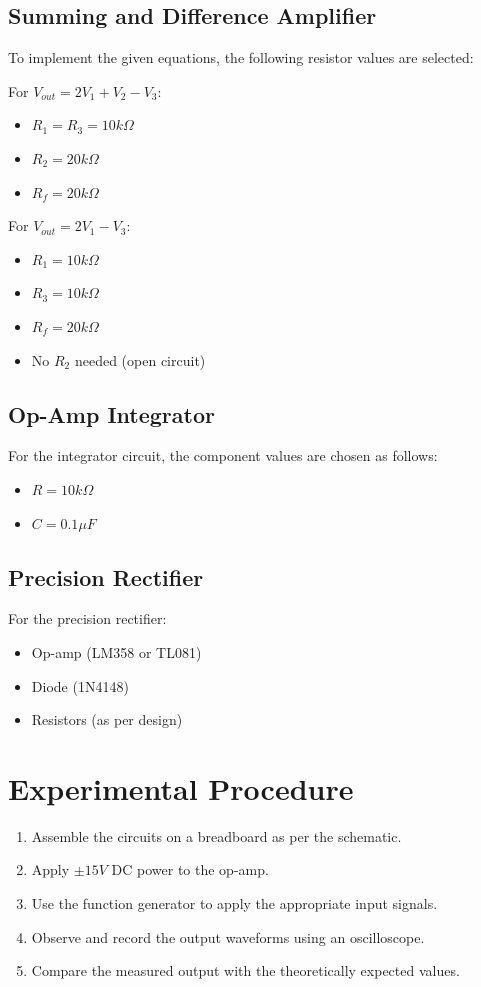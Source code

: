 \documentclass[a4paper,12pt]{article}
\begin{document}
\subsection{Summing and Difference Amplifier}
To implement the given equations, the following resistor values are selected:

For \( V_{out} = 2V_1 + V_2 - V_3 \):
\begin{itemize}
    \item \( R_1 = R_3 = 10k\Omega \)
    \item \( R_2 = 20k\Omega \)
    \item \( R_f = 20k\Omega \)
\end{itemize}

For \( V_{out} = 2V_1 - V_3 \):
\begin{itemize}
    \item \( R_1 = 10k\Omega \)
    \item \( R_3 = 10k\Omega \)
    \item \( R_f = 20k\Omega \)
    \item No \( R_2 \) needed (open circuit)
\end{itemize}

\subsection{Op-Amp Integrator}
For the integrator circuit, the component values are chosen as follows:
\begin{itemize}
    \item \( R = 10k\Omega \)
    \item \( C = 0.1\mu F \)
\end{itemize}

\subsection{Precision Rectifier}
For the precision rectifier:
\begin{itemize}
    \item Op-amp (LM358 or TL081)
    \item Diode (1N4148)
    \item Resistors (as per design)
\end{itemize}

\section{Experimental Procedure}
\begin{enumerate}
    \item Assemble the circuits on a breadboard as per the schematic.
    \item Apply \( \pm 15V \) DC power to the op-amp.
    \item Use the function generator to apply the appropriate input signals.
    \item Observe and record the output waveforms using an oscilloscope.
    \item Compare the measured output with the theoretically expected values.
\end{enumerate}
\end{document}
